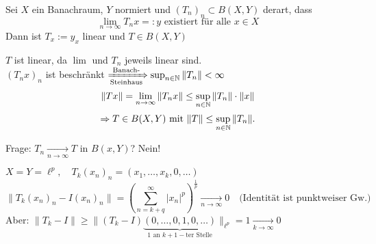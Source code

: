 \begin{kor} \label{kor:9.7}
	Sei $X$ ein Banachraum, $Y$ normiert und $(T_{n})_{n} \subset B(X, Y)$ derart, dass
	\[ \lim_{n \rightarrow \infty} T_{n} x =: y \text{ existiert für alle } x \in X \]
	Dann ist $T_{x} := y_{x}$ linear und $T \in B(X, Y)$
	\begin{beweis}
		$T$ ist linear, da $\lim$ und $T_{n}$ jeweils linear sind. \\
		$(T_{n} x)_{n}$ ist beschränkt $\xRightarrow[\text{Steinhaus}]{\text{Banach-}} \sup_{n \in \mathbb{N}} \| T_{n} \| < \infty$ \\
		\[ \| T x \| = \lim_{n \rightarrow \infty} \| T_{n} x \| \leq \sup_{n \in \mathbb{N}} \|T_{n} \| \cdot \|x \| \]
		\[ \Rightarrow T \in B(X, Y) \text{ mit } \| T \| \leq \sup_{n \in \mathbb{N}} \| T_{n} \|. \]
	\end{beweis}
\end{kor} 
Frage: $T_{n} \xrightarrow[n \rightarrow \infty]{} T$ in $B(x, Y)$? Nein! \\
\begin{beispiel*}
	$X = Y = \ell^{p}, \quad T_{k} (x_{n})_{n} = (x_{1}, \dotsc, x_{k}, 0, \dotsc)$ \\
	\[ \| T_{k} (x_{n})_{n} - I (x_{n})_{n} \| = \left( \sum_{n = k + q}^{\infty} | x_{n} |^{p} \right)^{\frac{1}{p}} \xrightarrow[n \rightarrow \infty]{} 0 \quad \text{(Identität ist punktweiser Gw.)} \]
	Aber: $\| T_{k} - I \| \geq \|(T_{k} - I)\underbrace{(0, \dotsc, 0, 1, 0, \dotsc)	}_{1 \text{ an } k+1-\text{ter Stelle}} \|_{\ell^{p}} = 1 \xrightarrow[k \rightarrow \infty]{} 0$
\end{beispiel*}

\newpage